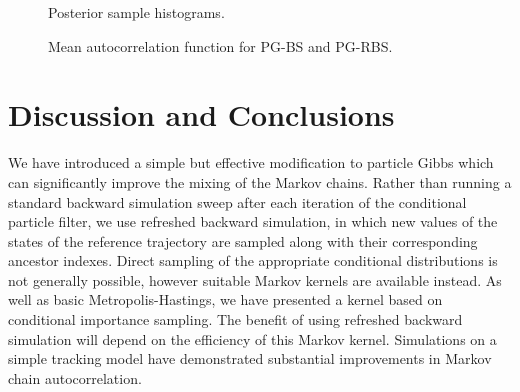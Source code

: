 \documentclass{article}
\begin{document}
\begin{figure}
\centering
\subfloat[PG-BS (N=100)]{  }
\subfloat[PG-BS (N=200)]{  }
\subfloat[PG-RBS (N=100)]{  }
\caption{Posterior sample histograms.}
\label{fig:sample_hist}
\end{figure}

\begin{figure}
\centering

\caption{Mean autocorrelation function for PG-BS and PG-RBS.}
\label{fig:acf}
\end{figure}


\section{Discussion and Conclusions}

We have introduced a simple but effective modification to particle Gibbs which can significantly improve the mixing of the Markov chains. Rather than running a standard backward simulation sweep after each iteration of the conditional particle filter, we use refreshed backward simulation, in which new values of the states of the reference trajectory are sampled along with their corresponding ancestor indexes. Direct sampling of the appropriate conditional distributions is not generally possible, however suitable Markov kernels are available instead. As well as basic Metropolis-Hastings, we have presented a kernel based on conditional importance sampling. The benefit of using refreshed backward simulation will depend on the efficiency of this Markov kernel. Simulations on a simple tracking model have demonstrated substantial improvements in Markov chain autocorrelation. 



\vfill
\pagebreak



\end{document}
